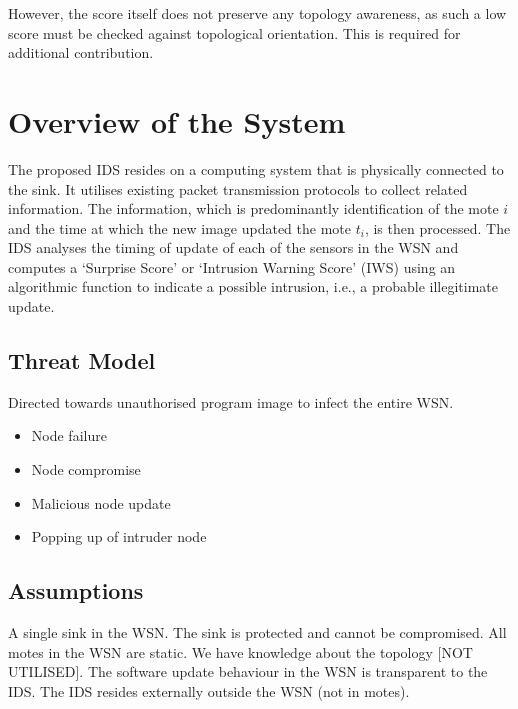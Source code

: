 \documentclass[conference,final]{IEEEtran}
\begin{document}
However, the score itself does not preserve any topology awareness, as such a low score must be checked against topological orientation.
This is required for additional contribution.


\section{Overview of the System}
\label{sec:des}
The proposed IDS resides on a computing system that is physically connected to the sink.
It utilises existing packet transmission protocols to collect related information. The information, which is predominantly identification of the mote $i$ and the time at which the new image updated the mote $t_i$, is then processed.
The IDS analyses the timing of update of each of the sensors in the WSN and computes a `Surprise Score' or `Intrusion Warning Score' (IWS) using an algorithmic function to indicate a possible intrusion, i.e., a probable illegitimate update.

\subsection{Threat Model}


Directed towards unauthorised program image to infect the entire WSN.
\begin{itemize}
\item Node failure
\item Node compromise
\item Malicious node update
\item Popping up of intruder node
\end{itemize}

\subsection{Assumptions}
\label{sc:assump}

A single sink in the WSN.
The sink is protected and cannot be compromised.
All motes in the WSN are static.
We have knowledge about the topology [NOT UTILISED].
The software update behaviour in the WSN is transparent to the IDS.
The IDS resides externally outside the WSN (not in motes).
\end{document}
